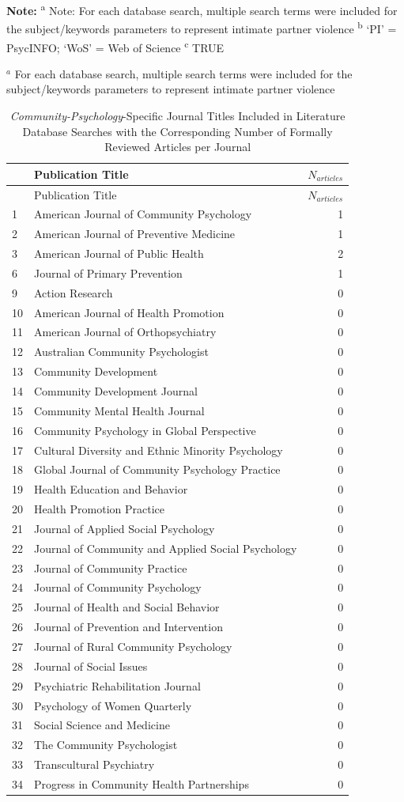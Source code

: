 \documentclass[11pt,]{tufte-book}
\begin{document}
\textbf{Note:} \textsuperscript{a} Note: For each database search,
multiple search terms were included for the subject/keywords parameters
to represent intimate partner violence \textsuperscript{b} `PI' =
PsycINFO; `WoS' = Web of Science \textsuperscript{c} TRUE

\tufteskip

\footnotesize{$^a$ For each database search, multiple search terms were included for the subject/keywords parameters to represent intimate partner violence}

\newpage

\begin{longtable}[]{@{}llr@{}}
\caption{\emph{Community-Psychology}-Specific Journal Titles Included in
Literature Database Searches with the Corresponding Number of Formally
Reviewed Articles per Journal \label{tbl:jcp}}\tabularnewline
\toprule
& Publication Title & \(N_{articles}\)\tabularnewline
\midrule
\endfirsthead
\toprule
& Publication Title & \(N_{articles}\)\tabularnewline
\midrule
\endhead
1 & American Journal of Community Psychology & 1\tabularnewline
2 & American Journal of Preventive Medicine & 1\tabularnewline
3 & American Journal of Public Health & 2\tabularnewline
6 & Journal of Primary Prevention & 1\tabularnewline
9 & Action Research & 0\tabularnewline
10 & American Journal of Health Promotion & 0\tabularnewline
11 & American Journal of Orthopsychiatry & 0\tabularnewline
12 & Australian Community Psychologist & 0\tabularnewline
13 & Community Development & 0\tabularnewline
14 & Community Development Journal & 0\tabularnewline
15 & Community Mental Health Journal & 0\tabularnewline
16 & Community Psychology in Global Perspective & 0\tabularnewline
17 & Cultural Diversity and Ethnic Minority Psychology &
0\tabularnewline
18 & Global Journal of Community Psychology Practice & 0\tabularnewline
19 & Health Education and Behavior & 0\tabularnewline
20 & Health Promotion Practice & 0\tabularnewline
21 & Journal of Applied Social Psychology & 0\tabularnewline
22 & Journal of Community and Applied Social Psychology &
0\tabularnewline
23 & Journal of Community Practice & 0\tabularnewline
24 & Journal of Community Psychology & 0\tabularnewline
25 & Journal of Health and Social Behavior & 0\tabularnewline
26 & Journal of Prevention and Intervention & 0\tabularnewline
27 & Journal of Rural Community Psychology & 0\tabularnewline
28 & Journal of Social Issues & 0\tabularnewline
29 & Psychiatric Rehabilitation Journal & 0\tabularnewline
30 & Psychology of Women Quarterly & 0\tabularnewline
31 & Social Science and Medicine & 0\tabularnewline
32 & The Community Psychologist & 0\tabularnewline
33 & Transcultural Psychiatry & 0\tabularnewline
34 & Progress in Community Health Partnerships & 0\tabularnewline
\bottomrule
\end{longtable}
\end{document}
